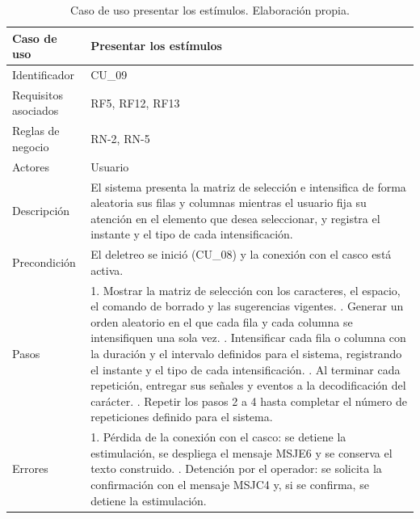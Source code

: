 \begin{table}[H]
\centering
\small
\begin{tabularx}{\textwidth}{|L{3.0cm}|Y|}
\hline
\textbf{Caso de uso} & \textbf{Presentar los estímulos} \\
\hline
Identificador & CU\_09 \\
\hline
Requisitos asociados & RF5, RF12, RF13 \\
\hline
Reglas de negocio & RN-2, RN-5 \\
\hline
Actores & Usuario \\
\hline
Descripción & El sistema presenta la matriz de selección e intensifica de forma aleatoria sus filas y columnas mientras el usuario fija su atención en el elemento que desea seleccionar, y registra el instante y el tipo de cada intensificación. \\
\hline
Precondición & El deletreo se inició (CU\_08) y la conexión con el casco está activa. \\
\hline
Pasos & 1. Mostrar la matriz de selección con los caracteres, el espacio, el comando de borrado y las sugerencias vigentes. . Generar un orden aleatorio en el que cada fila y cada columna se intensifiquen una sola vez. . Intensificar cada fila o columna con la duración y el intervalo definidos para el sistema, registrando el instante y el tipo de cada intensificación. . Al terminar cada repetición, entregar sus señales y eventos a la decodificación del carácter. . Repetir los pasos 2 a 4 hasta completar el número de repeticiones definido para el sistema. \\
\hline
Errores & 1. Pérdida de la conexión con el casco: se detiene la estimulación, se despliega el mensaje MSJE6 y se conserva el texto construido. . Detención por el operador: se solicita la confirmación con el mensaje MSJC4 y, si se confirma, se detiene la estimulación. \\
\hline
\end{tabularx}
\caption{Caso de uso presentar los estímulos. Elaboración propia.}
\label{tab:cu09}
\end{table}

